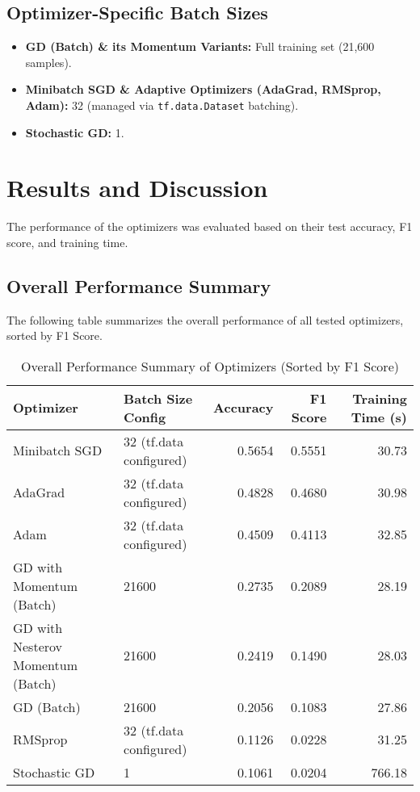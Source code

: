 \documentclass[11pt,a4paper]{article}
\begin{document}
\subsection{Optimizer-Specific Batch Sizes}
\begin{itemize}
    \item \textbf{GD (Batch) \& its Momentum Variants:} Full training set (21,600 samples).
    \item \textbf{Minibatch SGD \& Adaptive Optimizers (AdaGrad, RMSprop, Adam):} 32 (managed via \texttt{tf.data.Dataset} batching).
    \item \textbf{Stochastic GD:} 1.
\end{itemize}

\section{Results and Discussion}
The performance of the optimizers was evaluated based on their test accuracy, F1 score, and training time.

\subsection{Overall Performance Summary}
The following table summarizes the overall performance of all tested optimizers, sorted by F1 Score.

\begin{table}[H]
    \centering
    \caption{Overall Performance Summary of Optimizers (Sorted by F1 Score)}
    \label{tab:overall_summary}
    \begin{tabular}{@{}llrrr@{}}
        \toprule
        Optimizer                       & Batch Size Config        & Accuracy & F1 Score & Training Time (s) \\ \midrule
        Minibatch SGD                 & 32 (tf.data configured)  & 0.5654   & 0.5551   & 30.73             \\
        AdaGrad                         & 32 (tf.data configured)  & 0.4828   & 0.4680   & 30.98             \\
        Adam                            & 32 (tf.data configured)  & 0.4509   & 0.4113   & 32.85             \\
        GD with Momentum (Batch)        & 21600                    & 0.2735   & 0.2089   & 28.19             \\
        GD with Nesterov Momentum (Batch) & 21600                    & 0.2419   & 0.1490   & 28.03             \\
        GD (Batch)                      & 21600                    & 0.2056   & 0.1083   & 27.86             \\
        RMSprop                         & 32 (tf.data configured)  & 0.1126   & 0.0228   & 31.25             \\
        Stochastic GD                   & 1                        & 0.1061   & 0.0204   & 766.18            \\ \bottomrule
    \end{tabular}
\end{table}
\end{document}
